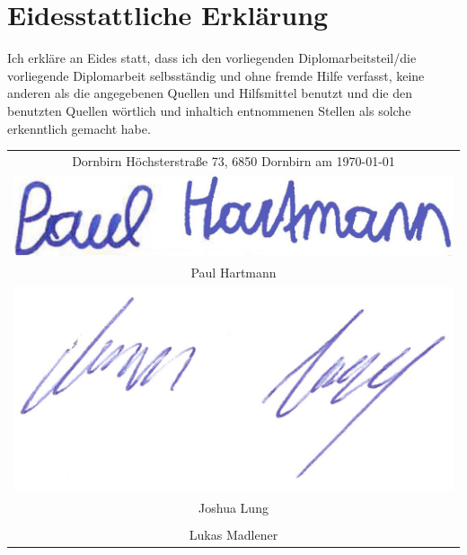 \section*{Eidesstattliche Erklärung}

Ich erkläre an Eides statt, dass ich den vorliegenden Diplomarbeitsteil/die vorliegende Diplomarbeit selbsständig und ohne fremde Hilfe verfasst, keine anderen als die angegebenen Quellen und Hilfsmittel benutzt und die den benutzten Quellen wörtlich und inhaltich entnommenen Stellen als solche erkenntlich gemacht habe.

\bigskip

\begin{table}[H]
  \centering
  \begin{tabular}{c}
    Dornbirn Höchsterstraße 73, 6850 Dornbirn am \today                \\
    \begin{minipage}[c][14ex]{0.25\textwidth}
      \includegraphics[width=1\textwidth]{images/Unterschrift_Paul.png}
    \end{minipage}   \\

    \hline
    Paul Hartmann                                                      \\
    \begin{minipage}[c][13ex]{0.25\textwidth}
      \includegraphics[width=1\textwidth]{images/Unterschrift_Joshua.png}
    \end{minipage} \\

    \hline
    Joshua Lung                                                        \\
    \\ [10ex]

    \hline
    Lukas Madlener                                                     \\
  \end{tabular}
\end{table}